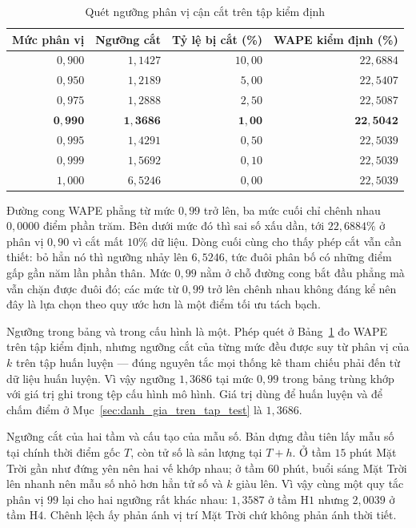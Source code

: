 \documentclass[12pt, a4paper]{report}
\begin{document}
\begin{table}[htbp]
\centering
\caption{Quét ngưỡng phân vị cận cắt trên tập kiểm định}
\label{tab:quet_phan_vi}
\small
\begin{tabular}{r r r r}
\toprule
\textbf{Mức phân vị} & \textbf{Ngưỡng cắt} & \textbf{Tỷ lệ bị cắt (\%)} & \textbf{WAPE kiểm định (\%)} \\
\midrule
$0{,}900$ & $1{,}1427$ & $10{,}00$ & $22{,}6884$ \\
$0{,}950$ & $1{,}2189$ & $5{,}00$  & $22{,}5407$ \\
$0{,}975$ & $1{,}2888$ & $2{,}50$  & $22{,}5087$ \\
$\mathbf{0{,}990}$ & $\mathbf{1{,}3686}$ & $\mathbf{1{,}00}$ & $\mathbf{22{,}5042}$ \\
$0{,}995$ & $1{,}4291$ & $0{,}50$  & $22{,}5039$ \\
$0{,}999$ & $1{,}5692$ & $0{,}10$  & $22{,}5039$ \\
$1{,}000$ & $6{,}5246$ & $0{,}00$ & $22{,}5039$ \\
\bottomrule
\end{tabular}


\end{table}

Đường cong WAPE phẳng từ mức $0{,}99$ trở lên, ba mức cuối chỉ chênh nhau $0{,}0000$ điểm
phần trăm. Bên dưới mức đó thì sai số xấu dần, tới $22{,}6884\%$ ở phân vị $0{,}90$ vì cắt mất
$10\%$ dữ liệu. Dòng cuối cùng cho thấy phép cắt vẫn cần thiết: bỏ hẳn nó thì ngưỡng nhảy
lên $6{,}5246$, tức đuôi phân bố có những điểm gấp gần năm lần phần thân. Mức $0{,}99$ nằm ở chỗ đường cong bắt đầu phẳng mà vẫn chặn được đuôi đó; các mức từ $0{,}99$
trở lên chênh nhau không đáng kể nên đây là lựa chọn theo quy ước hơn là một điểm tối ưu tách bạch.

Ngưỡng trong bảng và trong cấu hình là một. Phép quét ở Bảng~\ref{tab:quet_phan_vi}
đo WAPE trên tập kiểm định, nhưng ngưỡng cắt của từng mức đều được suy từ phân vị của $k$
trên tập huấn luyện --- đúng nguyên tắc mọi thống kê tham chiếu phải đến từ dữ liệu huấn
luyện. Vì vậy ngưỡng $1{,}3686$ tại mức $0{,}99$ trong bảng trùng khớp với giá trị ghi trong
tệp cấu hình mô hình. Giá trị dùng để huấn luyện và để chấm điểm ở
Mục~\ref{sec:danh_gia_tren_tap_test} là $1{,}3686$.

Ngưỡng cắt của hai tầm và cấu tạo của mẫu số. Bản dựng đầu tiên lấy mẫu số tại
chính thời điểm gốc $T$, còn tử số là sản lượng tại $T+h$. Ở tầm $15$ phút Mặt Trời gần như
đứng yên nên hai vế khớp nhau; ở tầm $60$ phút, buổi sáng Mặt Trời lên nhanh nên mẫu số nhỏ
hơn hẳn tử số và $k$ giàu lên. Vì vậy cùng một quy tắc phân vị $99$ lại cho hai ngưỡng rất
khác nhau: $1{,}3587$ ở tầm H$1$ nhưng $2{,}0039$ ở tầm H$4$. Chênh lệch ấy phản ánh vị trí
Mặt Trời chứ không phản ánh thời tiết.
\end{document}
